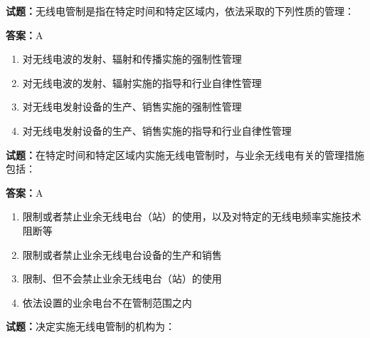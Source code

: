 \documentclass{ctexbook}
\begin{document}




\vspace{1em}

\textbf{试题：}无线电管制是指在特定时间和特定区域内，依法采取的下列性质的管理： 

\textbf{答案：}A 

\begin{enumerate}[leftmargin=3em]
  \item 对无线电波的发射、辐射和传播实施的强制性管理 

  \item 对无线电波的发射、辐射实施的指导和行业自律性管理 

  \item 对无线电发射设备的生产、销售实施的强制性管理 

  \item 对无线电发射设备的生产、销售实施的指导和行业自律性管理 

\end{enumerate}





\vspace{1em}

\textbf{试题：}在特定时间和特定区域内实施无线电管制时，与业余无线电有关的管理措施包括： 

\textbf{答案：}A 

\begin{enumerate}[leftmargin=3em]
  \item 限制或者禁止业余无线电台（站）的使用，以及对特定的无线电频率实施技术阻断等 

  \item 限制或者禁止业余无线电台设备的生产和销售 

  \item 限制、但不会禁止业余无线电台（站）的使用 

  \item 依法设置的业余电台不在管制范围之内 

\end{enumerate}





\vspace{1em}

\textbf{试题：}决定实施无线电管制的机构为： 
\end{document}
